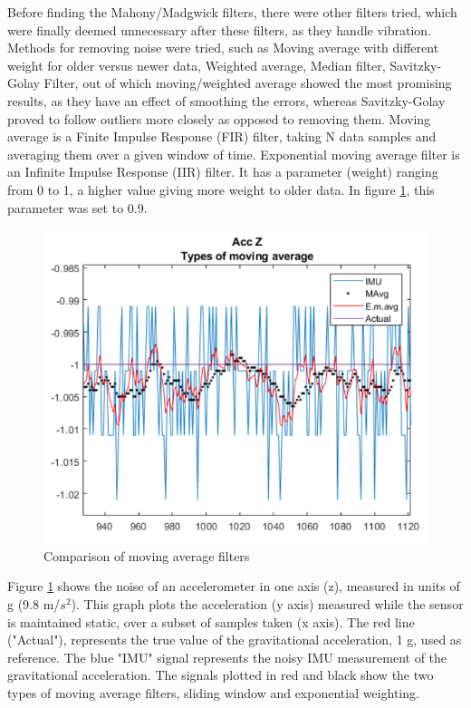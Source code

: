 Before finding the Mahony/Madgwick filters, there were other filters tried, which were finally deemed unnecessary after these filters, as they handle vibration. 
Methods for removing noise were tried, such as Moving average with different weight for older versus newer data, Weighted average, Median filter, Savitzky-Golay Filter, out of which moving/weighted average showed the most promising results, as they have an effect of smoothing the errors, whereas Savitzky-Golay proved to follow outliers more closely as opposed to removing them. 
 Moving average is a Finite Impulse Response (FIR) filter, taking N data samples and averaging them over a given window of time. 
Exponential moving average filter is an Infinite Impulse Response (IIR) filter. It has a parameter (weight) ranging from 0 to 1, a higher value giving more weight to older data. In figure  \ref{movingaverage}, this parameter was set to 0.9. 
\begin{figure}[H]
  \centering
  \includegraphics[scale=0.7]{graphics/accZ.png}
  \caption{Comparison of moving average filters}
  \label{movingaverage}
\end{figure}

Figure \ref{movingaverage} shows the noise of an accelerometer in one axis (z), measured in units of g (9.8 m/$s^2$). This graph plots the acceleration (y axis) measured while the sensor is maintained static, over a subset of samples taken (x axis).
The red line ("Actual"), represents the true value of the gravitational acceleration, 1 g, used as reference. The blue "IMU" signal represents the noisy IMU measurement of the gravitational acceleration. The signals plotted in red and black show the two types of moving average filters, sliding window and exponential weighting.


